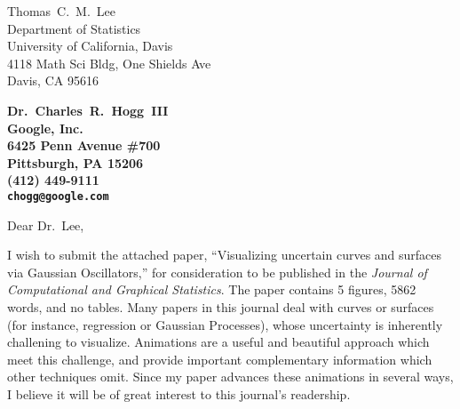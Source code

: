 \documentclass[11pt]{letter} %
\begin{document}

\begin{letter}{%
    Thomas~C.~M.~Lee \\
    Department of Statistics \\
    University of California, Davis  \\
    4118 Math Sci Bldg, One Shields Ave  \\
    Davis, CA 95616
}


\begin{center}
\large\bf Dr.~Charles~R.~Hogg~III \\ %
Google, Inc. \\ 6425 Penn Avenue \#700 \\ Pittsburgh, PA 15206 \\ (412) 449-9111 %
\\ \texttt{chogg@google.com}
\end{center} 
\vfill

\signature{Charles~R.~Hogg~III} %


\opening{Dear Dr.~Lee,} 

I wish to submit the attached paper, ``Visualizing uncertain curves and surfaces via Gaussian Oscillators,'' for consideration to be published in the \textit{Journal of Computational and Graphical Statistics}.
The paper contains 5 figures, 5862 words, and no tables.
Many papers in this journal deal with curves or surfaces (for instance, regression or Gaussian Processes), whose uncertainty is inherently challening to visualize.
Animations are a useful and beautiful approach which meet this challenge, and provide important complementary information which other techniques omit.
Since my paper advances these animations in several ways, I believe it will be of great interest to this journal's readership.


\end{letter}
\end{document}
